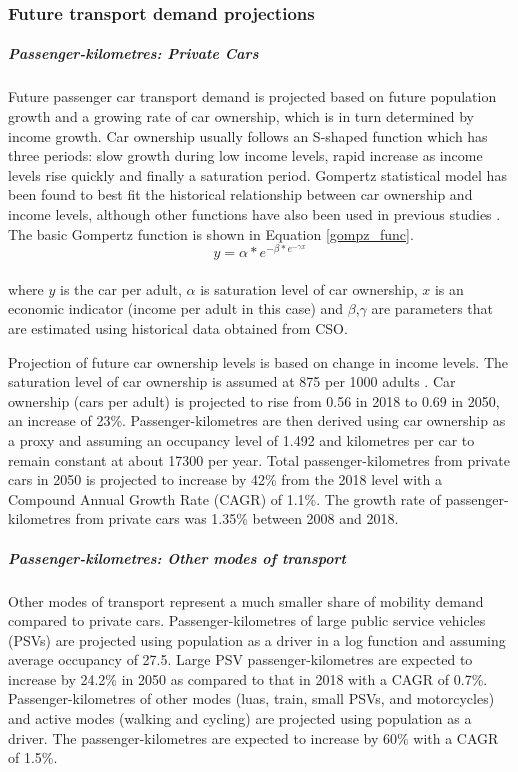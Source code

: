 \documentclass[gmd,manuscript]{copernicus}
\begin{document}
\subsubsection{Future transport demand projections}
\subparagraph{Passenger-kilometres: Private Cars}
Future passenger car transport demand is projected based on future population growth and a growing rate of car ownership, which is in turn determined by income growth. Car ownership usually follows an S-shaped function which has three periods: slow growth during low income levels, rapid increase as income levels rise quickly and finally a saturation period. Gompertz statistical model has been found to best fit the historical relationship between car ownership and income levels, although other functions have also been used in previous studies \citep{Lian2018}. The basic Gompertz function is shown in Equation \ref{gompz_func}.
\\
\begin{equation} \label{gompz_func}
 y=\alpha*e^{-\beta*e^{-\gamma x}}
\end{equation}
\\
where $y$ is the car per adult, $\alpha$ is saturation level of car ownership, $x$ is an economic indicator (income per adult in this case) and $\beta$,$\gamma$ are parameters that are estimated using historical data obtained from CSO. 

Projection of future car ownership levels is based on change in income levels. The saturation level of car ownership is assumed at 875 per 1000 adults \citep{AECOMIrelandLimited2019}. Car ownership (cars per adult) is projected to rise from 0.56 in 2018 to 0.69 in 2050, an increase of 23\%. Passenger-kilometres are then derived using car ownership as a proxy and assuming an occupancy level of 1.492 and kilometres per car to remain constant at about 17300 per year. Total passenger-kilometres from private cars in 2050 is projected to increase by 42\% from the 2018 level with a Compound Annual Growth Rate (CAGR) of 1.1\%. The growth rate of passenger-kilometres from private cars was 1.35\% between 2008 and 2018. 

\subparagraph{Passenger-kilometres: Other modes of transport}
Other modes of transport represent a much smaller share of mobility demand compared to private cars. Passenger-kilometres of large public service vehicles (PSVs) are projected using population as a driver in a log function and assuming average occupancy of 27.5. Large PSV passenger-kilometres are expected to increase by 24.2\% in 2050 as compared to that in 2018 with a CAGR of 0.7\%. Passenger-kilometres of other modes (luas, train, small PSVs, and motorcycles) and active modes (walking and cycling) are projected using population as a driver. The passenger-kilometres are expected to increase by 60\% with a CAGR of 1.5\%. 
\end{document}
